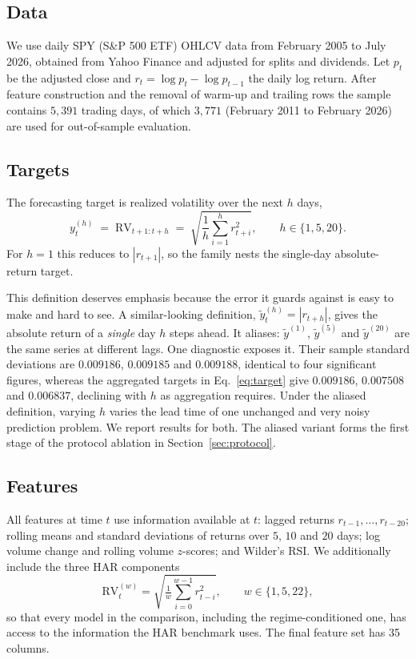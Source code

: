 \documentclass[sigconf,nonacm]{acmart}
\begin{document}
\subsection{Data}

We use daily SPY (S\&P 500 ETF) OHLCV data from February 2005 to July 2026,
obtained from Yahoo Finance and adjusted for splits and dividends. Let
$p_t$ be the adjusted close and $r_t = \log p_t - \log p_{t-1}$ the daily log
return. After feature construction and the removal of warm-up and trailing rows
the sample contains $5{,}391$ trading days, of which $3{,}771$ (February 2011 to
February 2026) are used for out-of-sample evaluation.

\subsection{Targets}

The forecasting target is realized volatility over the next $h$ days,
\begin{equation}
  y_t^{(h)} \;=\; \mathrm{RV}_{t+1:t+h} \;=\; \sqrt{\frac{1}{h}\sum_{i=1}^{h} r_{t+i}^2},
  \qquad h \in \{1, 5, 20\}.
  \label{eq:target}
\end{equation}
For $h=1$ this reduces to $|r_{t+1}|$, so the family nests the single-day
absolute-return target.

This definition deserves emphasis because the error it guards against is easy to
make and hard to see. A similar-looking definition,
$\tilde{y}_t^{(h)} = |r_{t+h}|$, gives the absolute return of a \emph{single} day
$h$ steps ahead. It aliases: $\tilde{y}^{(1)}$, $\tilde{y}^{(5)}$ and
$\tilde{y}^{(20)}$ are the same series at different lags. One diagnostic exposes
it. Their sample standard deviations are $0.009186$, $0.009185$ and $0.009188$,
identical to four significant figures, whereas the aggregated targets in
Eq.~\eqref{eq:target} give $0.009186$, $0.007508$ and $0.006837$, declining with
$h$ as aggregation requires. Under the aliased definition, varying $h$ varies the
lead time of one unchanged and very noisy prediction problem. We report results
for both. The aliased variant forms the first stage of the protocol ablation in
Section~\ref{sec:protocol}.

\subsection{Features}

All features at time $t$ use information available at $t$: lagged returns
$r_{t-1},\dots,r_{t-20}$; rolling means and standard deviations of returns over
$5$, $10$ and $20$ days; log volume change and rolling volume $z$-scores; and
Wilder's RSI. We additionally include the three HAR components
\begin{equation}
  \mathrm{RV}^{(w)}_t = \sqrt{\tfrac{1}{w}\textstyle\sum_{i=0}^{w-1} r_{t-i}^2},
  \qquad w \in \{1, 5, 22\},
\end{equation}
so that every model in the comparison, including the regime-conditioned one, has
access to the information the HAR benchmark uses. The final feature set has 35
columns.
\end{document}

